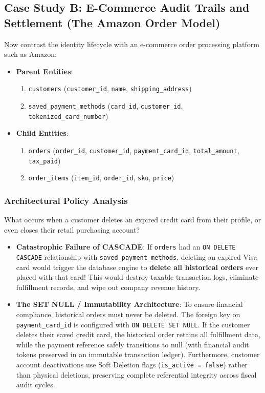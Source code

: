 \documentclass[10pt,journal,compsoc,onecolumn]{IEEEtran}
\begin{document}
\subsection{Case Study B: E-Commerce Audit Trails and Settlement (The Amazon Order Model)}
Now contrast the identity lifecycle with an e-commerce order processing platform such as Amazon:
\begin{itemize}
    \item \textbf{Parent Entities}: 
    \begin{enumerate}
        \item \texttt{customers} (\texttt{customer\_id}, \texttt{name}, \texttt{shipping\_address})
        \item \texttt{saved\_payment\_methods} (\texttt{card\_id}, \texttt{customer\_id}, \texttt{tokenized\_card\_number})
    \end{enumerate}
    \item \textbf{Child Entities}: 
    \begin{enumerate}
        \item \texttt{orders} (\texttt{order\_id}, \texttt{customer\_id}, \texttt{payment\_card\_id}, \texttt{total\_amount}, \texttt{tax\_paid})
        \item \texttt{order\_items} (\texttt{item\_id}, \texttt{order\_id}, \texttt{sku}, \texttt{price})
    \end{enumerate}
\end{itemize}

\subsubsection{Architectural Policy Analysis}
What occurs when a customer deletes an expired credit card from their profile, or even closes their retail purchasing account?
\begin{itemize}
    \item \textbf{Catastrophic Failure of CASCADE}: If \texttt{orders} had an \texttt{ON DELETE CASCADE} relationship with \texttt{saved\_payment\_methods}, deleting an expired Visa card would trigger the database engine to \textbf{delete all historical orders} ever placed with that card! This would destroy taxable transaction logs, eliminate fulfillment records, and wipe out company revenue history.
    \item \textbf{The SET NULL / Immutability Architecture}: To ensure financial compliance, historical orders must never be deleted. 
    The foreign key on \texttt{payment\_card\_id} is configured with \texttt{ON DELETE SET NULL}. If the customer deletes their saved credit card, the historical order retains all fulfillment data, while the payment reference safely transitions to null (with financial audit tokens preserved in an immutable transaction ledger).
    Furthermore, customer account deactivations use Soft Deletion flags (\texttt{is\_active = false}) rather than physical deletions, preserving complete referential integrity across fiscal audit cycles.
\end{itemize}
\end{document}
